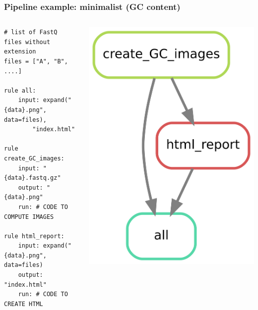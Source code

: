 \documentclass{beamer}
\begin{document}
\begin{frame}[fragile]
  \frametitle{Pipeline example: minimalist (GC content)} 
  \centering
  
  \begin{columns}
    \begin{column}{7.2cm}
      \hspace{-2cm}
      \begin{lstlisting}
# list of FastQ files without extension
files = ["A", "B", ....]

rule all:
    input: expand("{data}.png", data=files), 
        "index.html"

rule create_GC_images:
    input: "{data}.fastq.gz"
    output: "{data}.png"
    run: # CODE TO COMPUTE IMAGES
        
rule html_report:
    input: expand("{data}.png", data=files)
    output: "index.html"
    run: # CODE TO CREATE HTML 
      \end{lstlisting} 
    \end{column}
    \begin{column}{3.9cm}
      \hspace{1cm}
      \includegraphics[scale=2.2]{./images/gc.png}
    \end{column}
  \end{columns}
\end{frame}
\end{document}
